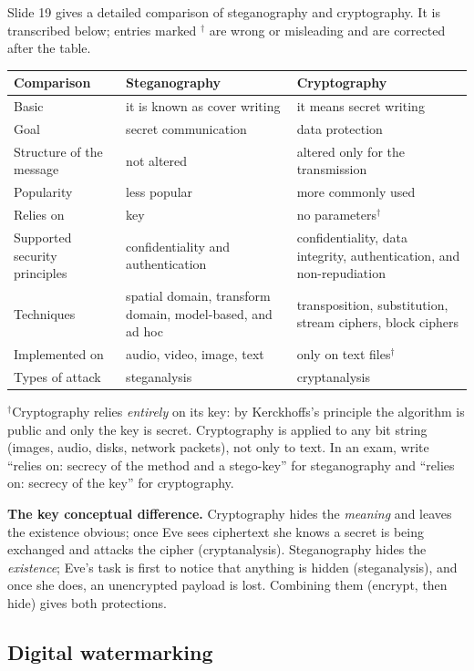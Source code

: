 Slide 19 gives a detailed comparison of steganography and cryptography. It is transcribed below; entries marked $^\dagger$ are wrong or misleading and are corrected after the table.
\begin{center}\small
\begin{tabularx}{\textwidth}{@{}l X X@{}}
\toprule
Comparison & Steganography & Cryptography\\
\midrule
Basic & it is known as cover writing & it means secret writing\\
Goal & secret communication & data protection\\
Structure of the message & not altered & altered only for the transmission\\
Popularity & less popular & more commonly used\\
Relies on & key & no parameters$^\dagger$\\
Supported security principles & confidentiality and authentication & confidentiality, data integrity, authentication, and non-repudiation\\
Techniques & spatial domain, transform domain, model-based, and ad hoc & transposition, substitution, stream ciphers, block ciphers\\
Implemented on & audio, video, image, text & only on text files$^\dagger$\\
Types of attack & steganalysis & cryptanalysis\\
\bottomrule
\end{tabularx}
\end{center}
$^\dagger$Cryptography relies \emph{entirely} on its key: by Kerckhoffs's principle the algorithm is public and only the key is secret. Cryptography is applied to any bit string (images, audio, disks, network packets), not only to text. In an exam, write ``relies on: secrecy of the method and a stego-key'' for steganography and ``relies on: secrecy of the key'' for cryptography.

\textbf{The key conceptual difference.} Cryptography hides the \emph{meaning} and leaves the existence obvious; once Eve sees ciphertext she knows a secret is being exchanged and attacks the cipher (cryptanalysis). Steganography hides the \emph{existence}; Eve's task is first to notice that anything is hidden (steganalysis), and once she does, an unencrypted payload is lost. Combining them (encrypt, then hide) gives both protections.

\subsection{Digital watermarking \hot\new}

